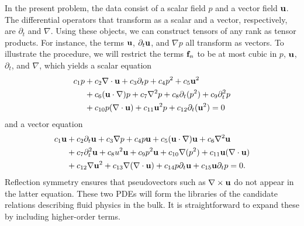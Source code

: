 \documentclass[
 reprint,
 amsmath,amssymb,
 aps,
]{revtex4-2}
\begin{document}
In the present problem, the data consist of a scalar field $p$ and a vector field ${\bf u}$. The differential operators that transform as a scalar and a vector, respectively, are $\partial_t$ and $\nabla$. Using these objects, we can construct tensors of any rank as tensor products. For instance, the terms ${\bf u}$, $\partial_t{\bf u}$, and $\nabla p$ all transform as vectors. To illustrate the procedure, we will restrict the terms ${\bf f}_n$ to be at most cubic in $p$, ${\bf u}$, $\partial_t$, and $\nabla$, which yields a scalar equation
\begin{equation}
\begin{aligned}
c_1p&+c_2\nabla\cdot{\bf u}+c_3 \partial_t p+c_4p^2+c_5{\bf u}^2\\
&+c_6({\bf u}\cdot\nabla)p+c_7\nabla^2p+c_8\partial_t(p^2)+c_9\partial^2_tp\\
&+c_{10}p(\nabla\cdot {\bf u})+c_{11}{\bf u}^2p+c_{12}\partial_t({\bf u}^2)=0
\label{eq:rank0}
\end{aligned}
\end{equation}
and a vector equation
\begin{equation}
\begin{aligned}
c_1{\bf u}&+c_2\partial_t{\bf u}+c_3\nabla p+c_4p{\bf u}+c_5({\bf u}\cdot\nabla){\bf u}+c_6\nabla^2{\bf u}\\
&+c_7\partial^2_t{\bf u}+c_8u^2{\bf u}
+c_9p^2{\bf u}+c_{10}\nabla (p^2)+c_{11}{\bf u}(\nabla\cdot{\bf u})\\
&+c_{12}\nabla{\bf u}^2+c_{13}\nabla(\nabla\cdot{\bf u})+c_{14}p \partial_t {\bf u}+c_{15}{\bf u} \partial_t p = 0.
\label{eq:rank1}
\end{aligned}
\end{equation}
Reflection symmetry ensures that pseudovectors such as $\nabla\times{\bf u}$ do not appear in the latter equation.
These two PDEs will form the libraries of the candidate relations describing fluid physics in the bulk. It is straightforward to expand these by including higher-order terms.
\end{document}
